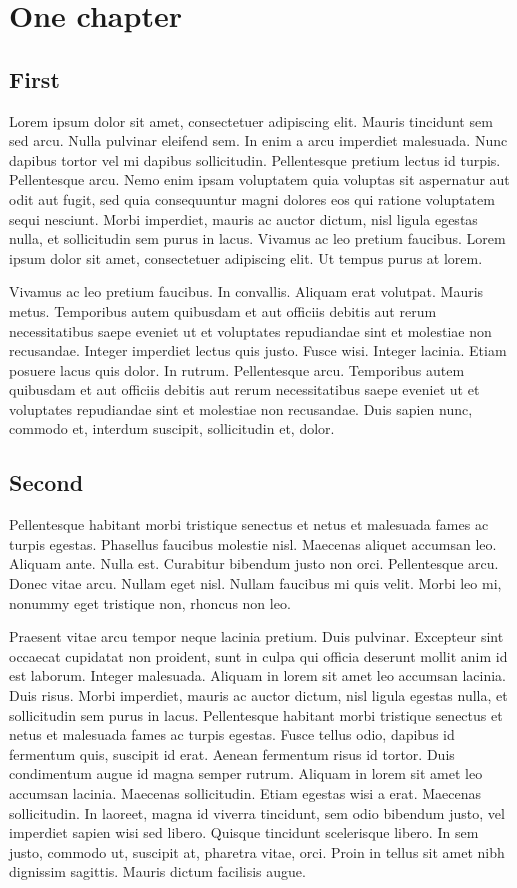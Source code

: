 \documentclass[
  color, %
  table, %
  lof,   %
  lot,   %
]{fithesis3}
\begin{document}
\chapter{One chapter}
\section{First}
Lorem ipsum dolor sit amet, consectetuer adipiscing elit. Mauris tincidunt sem sed arcu. Nulla pulvinar eleifend sem. In enim a arcu imperdiet malesuada. Nunc dapibus tortor vel mi dapibus sollicitudin. Pellentesque pretium lectus id turpis. Pellentesque arcu. Nemo enim ipsam voluptatem quia voluptas sit aspernatur aut odit aut fugit, sed quia consequuntur magni dolores eos qui ratione voluptatem sequi nesciunt. Morbi imperdiet, mauris ac auctor dictum, nisl ligula egestas nulla, et sollicitudin sem purus in lacus. Vivamus ac leo pretium faucibus. Lorem ipsum dolor sit amet, consectetuer adipiscing elit. Ut tempus purus at lorem.

Vivamus ac leo pretium faucibus. In convallis. Aliquam erat volutpat. Mauris metus. Temporibus autem quibusdam et aut officiis debitis aut rerum necessitatibus saepe eveniet ut et voluptates repudiandae sint et molestiae non recusandae. Integer imperdiet lectus quis justo. Fusce wisi. Integer lacinia. Etiam posuere lacus quis dolor. In rutrum. Pellentesque arcu. Temporibus autem quibusdam et aut officiis debitis aut rerum necessitatibus saepe eveniet ut et voluptates repudiandae sint et molestiae non recusandae. Duis sapien nunc, commodo et, interdum suscipit, sollicitudin et, dolor.

\section{Second}
Pellentesque habitant morbi tristique senectus et netus et malesuada fames ac turpis egestas. Phasellus faucibus molestie nisl. Maecenas aliquet accumsan leo. Aliquam ante. Nulla est. Curabitur bibendum justo non orci. Pellentesque arcu. Donec vitae arcu. Nullam eget nisl. Nullam faucibus mi quis velit. Morbi leo mi, nonummy eget tristique non, rhoncus non leo.

Praesent vitae arcu tempor neque lacinia pretium. Duis pulvinar. Excepteur sint occaecat cupidatat non proident, sunt in culpa qui officia deserunt mollit anim id est laborum. Integer malesuada. Aliquam in lorem sit amet leo accumsan lacinia. Duis risus. Morbi imperdiet, mauris ac auctor dictum, nisl ligula egestas nulla, et sollicitudin sem purus in lacus. Pellentesque habitant morbi tristique senectus et netus et malesuada fames ac turpis egestas. Fusce tellus odio, dapibus id fermentum quis, suscipit id erat. Aenean fermentum risus id tortor. Duis condimentum augue id magna semper rutrum. Aliquam in lorem sit amet leo accumsan lacinia. Maecenas sollicitudin. Etiam egestas wisi a erat. Maecenas sollicitudin. In laoreet, magna id viverra tincidunt, sem odio bibendum justo, vel imperdiet sapien wisi sed libero. Quisque tincidunt scelerisque libero. In sem justo, commodo ut, suscipit at, pharetra vitae, orci. Proin in tellus sit amet nibh dignissim sagittis. Mauris dictum facilisis augue.
\end{document}
